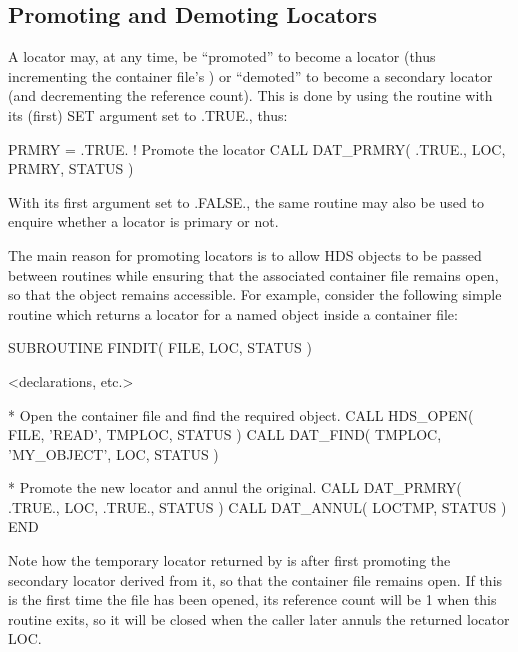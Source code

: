 \documentclass[twoside,11pt]{starlink}
\providecommand{\qt}[1]{``#1''}
\begin{document}
\subsection{\label{sect:promote}Promoting and Demoting Locators}

A locator may, at any time, be \qt{promoted} to become a
 locator (thus incrementing the
container file's ) or
\qt{demoted} to become a secondary locator (and decrementing the
reference count). This is done by using the
 routine with its (first) SET argument
set to .TRUE., thus:

\begin{small}
\begin{terminalv}
PRMRY = .TRUE.             ! Promote the locator
CALL DAT_PRMRY( .TRUE., LOC, PRMRY, STATUS )
\end{terminalv}
\end{small}

With its first argument set to .FALSE., the same routine may also be
used to enquire whether a locator is primary or not.

The main reason for promoting locators is to allow HDS objects to be
passed between routines while ensuring that the associated container
file remains open, so that the object remains accessible. For example,
consider the following simple routine which returns a locator for a
named object inside a container file:

\begin{small}
\begin{terminalv}
      SUBROUTINE FINDIT( FILE, LOC, STATUS )

      <declarations, etc.>

*  Open the container file and find the required object.
      CALL HDS_OPEN( FILE, 'READ', TMPLOC, STATUS )
      CALL DAT_FIND( TMPLOC, 'MY_OBJECT', LOC, STATUS )

*  Promote the new locator and annul the original.
      CALL DAT_PRMRY( .TRUE., LOC, .TRUE., STATUS )
      CALL DAT_ANNUL( LOCTMP, STATUS )
      END
\end{terminalv}
\end{small}

Note how the temporary locator returned by
 is  after
first promoting the secondary locator derived from it, so that the
container file remains open. If this is the first time the file has
been opened, its reference count will be 1 when this routine exits, so
it will be closed when the caller later annuls the returned locator
LOC.
\end{document}
